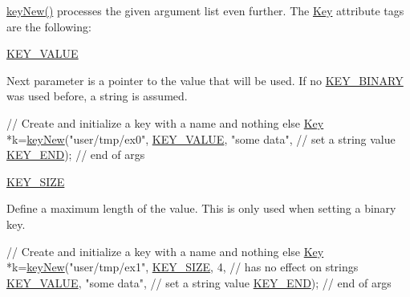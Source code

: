 \hyperlink{group__key_gad23c65b44bf48d773759e1f9a4d43b89}{key\-New()} processes the given argument list even further. The \hyperlink{classkdb_1_1Key}{Key} attribute tags are the following\-:
\begin{DoxyItemize}
\item \hyperlink{group__key_gga91fb3178848bd682000958089abbaf40ac66e4a49d09212b79f5754ca6db5bd2e}{K\-E\-Y\-\_\-\-V\-A\-L\-U\-E} \par
 Next parameter is a pointer to the value that will be used. If no \hyperlink{group__key_gga91fb3178848bd682000958089abbaf40a1ca18d4e094ae7487d35ecedda2235ff}{K\-E\-Y\-\_\-\-B\-I\-N\-A\-R\-Y} was used before, a string is assumed. 
\begin{DoxyCodeInclude}
\textcolor{comment}{// Create and initialize a key with a name and nothing else}
\hyperlink{classkdb_1_1Key_a5679f5cae63caddd64a60388b9cc77fa}{Key} *k=\hyperlink{group__key_gad23c65b44bf48d773759e1f9a4d43b89}{keyNew}(\textcolor{stringliteral}{"user/tmp/ex0"},
        \hyperlink{group__key_gga91fb3178848bd682000958089abbaf40ac66e4a49d09212b79f5754ca6db5bd2e}{KEY\_VALUE}, \textcolor{stringliteral}{"some data"},    \textcolor{comment}{// set a string value}
        \hyperlink{group__key_gga91fb3178848bd682000958089abbaf40aa8adb6fcb92dec58fb19410eacfdd403}{KEY\_END});                  \textcolor{comment}{// end of args}
\end{DoxyCodeInclude}

\item \hyperlink{group__key_gga91fb3178848bd682000958089abbaf40a6d531b5c41445d19d0452eebdccbfa01}{K\-E\-Y\-\_\-\-S\-I\-Z\-E} \par
 Define a maximum length of the value. This is only used when setting a binary key. 
\begin{DoxyCodeInclude}
\textcolor{comment}{// Create and initialize a key with a name and nothing else}
\hyperlink{classkdb_1_1Key_a5679f5cae63caddd64a60388b9cc77fa}{Key} *k=\hyperlink{group__key_gad23c65b44bf48d773759e1f9a4d43b89}{keyNew}(\textcolor{stringliteral}{"user/tmp/ex1"},
        \hyperlink{group__key_gga91fb3178848bd682000958089abbaf40a6d531b5c41445d19d0452eebdccbfa01}{KEY\_SIZE}, 4,               \textcolor{comment}{// has no effect on strings}
        \hyperlink{group__key_gga91fb3178848bd682000958089abbaf40ac66e4a49d09212b79f5754ca6db5bd2e}{KEY\_VALUE}, \textcolor{stringliteral}{"some data"},    \textcolor{comment}{// set a string value}
        \hyperlink{group__key_gga91fb3178848bd682000958089abbaf40aa8adb6fcb92dec58fb19410eacfdd403}{KEY\_END});                  \textcolor{comment}{// end of args}
\end{DoxyCodeInclude}


\end{DoxyItemize}
